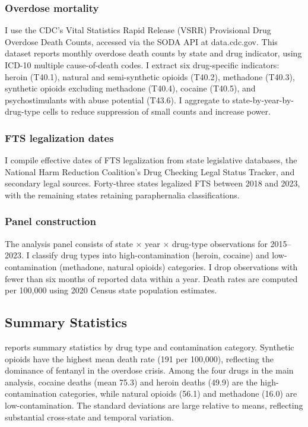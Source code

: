 \documentclass[12pt]{article}
\begin{document}
\subsubsection*{Overdose mortality}
I use the CDC's Vital Statistics Rapid Release (VSRR) Provisional Drug Overdose Death Counts, accessed via the SODA API at data.cdc.gov. This dataset reports monthly overdose death counts by state and drug indicator, using ICD-10 multiple cause-of-death codes. I extract six drug-specific indicators: heroin (T40.1), natural and semi-synthetic opioids (T40.2), methadone (T40.3), synthetic opioids excluding methadone (T40.4), cocaine (T40.5), and psychostimulants with abuse potential (T43.6). I aggregate to state-by-year-by-drug-type cells to reduce suppression of small counts and increase power.

\subsubsection*{FTS legalization dates}
I compile effective dates of FTS legalization from state legislative databases, the National Harm Reduction Coalition's Drug Checking Legal Status Tracker, and secondary legal sources. Forty-three states legalized FTS between 2018 and 2023, with the remaining states retaining paraphernalia classifications.

\subsubsection*{Panel construction}
The analysis panel consists of state $\times$ year $\times$ drug-type observations for 2015--2023. I classify drug types into high-contamination (heroin, cocaine) and low-contamination (methadone, natural opioids) categories. I drop observations with fewer than six months of reported data within a year. Death rates are computed per 100,000 using 2020 Census state population estimates.

\subsection{Summary Statistics}



 reports summary statistics by drug type and contamination category. Synthetic opioids have the highest mean death rate (191 per 100,000), reflecting the dominance of fentanyl in the overdose crisis. Among the four drugs in the main analysis, cocaine deaths (mean 75.3) and heroin deaths (49.9) are the high-contamination categories, while natural opioids (56.1) and methadone (16.0) are low-contamination. The standard deviations are large relative to means, reflecting substantial cross-state and temporal variation.
\end{document}
